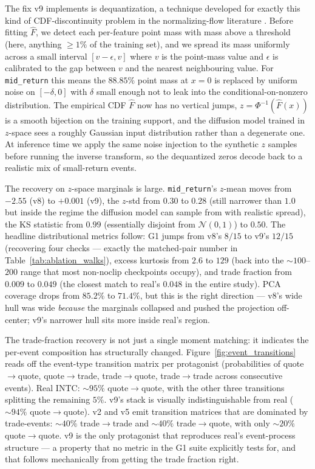 \documentclass[journal]{IEEEtran}
\theoremstyle{definition}   %
\begin{document}
The fix v9 implements is dequantization, a technique developed for
exactly this kind of CDF-discontinuity problem in the
normalizing-flow literature \cite{theis2016note}. Before fitting
$\hat{F}$, we detect each per-feature point mass with mass above a
threshold (here, anything $\ge 1\%$ of the training set), and we
spread its mass uniformly across a small interval $[v - \epsilon, v]$
where $v$ is the point-mass value and $\epsilon$ is calibrated to
the gap between $v$ and the nearest neighbouring value. For
\texttt{mid\_return} this means the $88.85\%$ point mass at
$x = 0$ is replaced by uniform noise on $[-\delta, 0]$ with $\delta$
small enough not to leak into the conditional-on-nonzero
distribution. The empirical CDF $\hat{F}$ now has no vertical jumps,
$z = \Phi^{-1}(\hat{F}(x))$ is a smooth bijection on the training
support, and the diffusion model trained in $z$-space sees a roughly
Gaussian input distribution rather than a degenerate one. At
inference time we apply the same noise injection to the synthetic
$z$ samples before running the inverse transform, so the dequantized
zeros decode back to a realistic mix of small-return events.

The recovery on $z$-space marginals is large.
\texttt{mid\_return}'s $z$-mean moves from $-2.55$ (v8) to $+0.001$
(v9), the $z$-std from $0.30$ to $0.28$ (still narrower than $1.0$
but inside the regime the diffusion model can sample from with
realistic spread), the KS statistic from $0.99$ (essentially
disjoint from $\mathcal{N}(0, 1)$) to $0.50$. The headline
distributional metrics follow: G1 jumps from v8's $8/15$ to v9's
$12/15$ (recovering four checks --- exactly the matched-pair number
in Table~\ref{tab:ablation_walks}), excess kurtosis from $2.6$ to
$129$ (back into the $\sim 100$--$200$ range that most non-noclip
checkpoints occupy), and trade fraction from $0.009$ to $0.049$
(the closest match to real's $0.048$ in the entire study). PCA
coverage drops from $85.2\%$ to $71.4\%$, but this is the right
direction --- v8's wide hull was wide \emph{because} the marginals
collapsed and pushed the projection off-center; v9's narrower hull
sits more inside real's region.

The trade-fraction recovery is not just a single moment matching:
it indicates the per-event composition has structurally changed.
Figure~\ref{fig:event_transitions} reads off the event-type
transition matrix per protagonist (probabilities of
quote$\to$quote, quote$\to$trade, trade$\to$quote, trade$\to$trade
across consecutive events). Real INTC: $\sim 95\%$
quote$\to$quote, with the other three transitions splitting the
remaining $5\%$. v9's stack is visually indistinguishable from
real ($\sim 94\%$ quote$\to$quote). v2 and v5 emit transition
matrices that are dominated by trade-events: $\sim 40\%$
trade$\to$trade and $\sim 40\%$ trade$\to$quote, with only
$\sim 20\%$ quote$\to$quote. v9 is the only protagonist that
reproduces real's event-process structure --- a property that no
metric in the G1 suite explicitly tests for, and that follows
mechanically from getting the trade fraction right.
\end{document}
